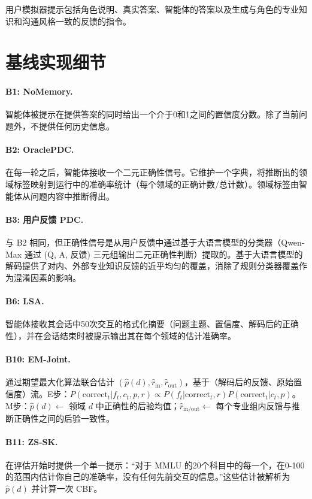 \documentclass[11pt,a4paper,fontset=fandol]{ctexart}
\begin{document}
用户模拟器提示包括角色说明、真实答案、智能体的答案以及生成与角色的专业知识和沟通风格一致的反馈的指令。

\section{基线实现细节}
\label{app:baselines_impl}

\paragraph{B1: NoMemory.} 智能体被提示在提供答案的同时给出一个介于0和1之间的置信度分数。除了当前问题外，不提供任何历史信息。

\paragraph{B2: OraclePDC.} 在每一轮之后，智能体接收一个二元正确性信号。它维护一个字典，将推断出的领域标签映射到运行中的准确率统计（每个领域的正确计数/总计数）。领域标签由智能体从问题内容中推断得出。

\paragraph{B3: 用户反馈 PDC.} 与 B2 相同，但正确性信号是从用户反馈中通过基于大语言模型的分类器（Qwen-Max 通过 (Q, A, 反馈) 三元组输出二元正确性判断）提取的。基于大语言模型的解码提供了对内、外部专业知识反馈的近乎均匀的覆盖，消除了规则分类器覆盖作为混淆因素的影响。

\paragraph{B6: LSA.} 智能体接收其会话中50次交互的格式化摘要（问题主题、置信度、解码后的正确性），并在会话结束时被提示输出其在每个领域的估计准确率。

\paragraph{B10: EM-Joint.} 通过期望最大化算法联合估计 $(\hat p(d), \hat r_{\text{in}}, \hat r_{\text{out}})$，基于（解码后的反馈、原始置信度）流。E步：$P(\text{correct}_t | f_t, c_t, p, r) \propto P(f_t | \text{correct}_t, r) P(\text{correct}_t | c_t, p)$。M步：$\hat p(d) \leftarrow$ 领域 $d$ 中正确性的后验均值；$\hat r_{\text{in/out}} \leftarrow$ 每个专业组内反馈与推断正确性之间的后验一致性。

\paragraph{B11: ZS-SK.} 在评估开始时提供一个单一提示：“对于 MMLU 的20个科目中的每一个，在0-100的范围内估计你自己的准确率，没有任何先前交互的信息。”这些估计被解析为 $\hat p(d)$ 并计算一次 CBF。
\end{document}
